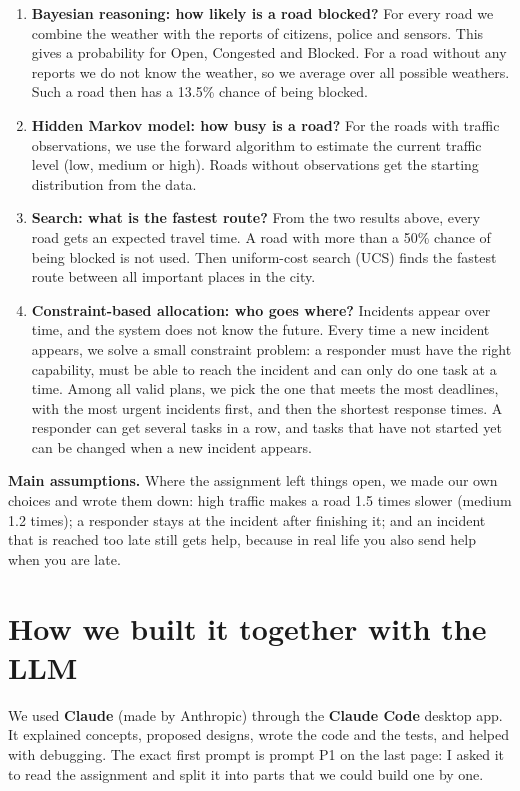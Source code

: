 \documentclass[11pt,a4paper]{article}
\begin{document}
\begin{enumerate}
  \item \textbf{Bayesian reasoning: how likely is a road blocked?}
    For every road we combine the weather with the reports of citizens, police
    and sensors. This gives a probability for Open, Congested and Blocked. For a
    road without any reports we do not know the weather, so we average over all
    possible weathers. Such a road then has a 13.5\% chance of being blocked.
  \item \textbf{Hidden Markov model: how busy is a road?}
    For the roads with traffic observations, we use the forward algorithm to
    estimate the current traffic level (low, medium or high). Roads without
    observations get the starting distribution from the data.
  \item \textbf{Search: what is the fastest route?}
    From the two results above, every road gets an expected travel time. A road
    with more than a 50\% chance of being blocked is not used. Then uniform-cost search
    (UCS) finds the fastest route between all important places in the city.
  \item \textbf{Constraint-based allocation: who goes where?}
    Incidents appear over time, and the system does not know the future. Every
    time a new incident appears, we solve a small constraint problem: a
    responder must have the right capability, must be able to reach the
    incident and can only do one task at a time. Among all valid plans, we pick
    the one that meets the most deadlines, with the most urgent incidents
    first, and then the shortest response times. A responder can get several
    tasks in a row, and tasks that have not started yet can be changed when a
    new incident appears.
\end{enumerate}

\textbf{Main assumptions.} Where the assignment left things open, we made our
own choices and wrote them down: high traffic makes a road 1.5 times slower
(medium 1.2 times); a responder stays at the incident after finishing it; and an
incident that is reached too late still gets help, because in real life you
also send help when you are late.

\section{How we built it together with the LLM}

We used \textbf{Claude} (made by Anthropic) through the \textbf{Claude Code}
desktop app. It explained concepts, proposed designs, wrote the code and the
tests, and helped with debugging. The exact first prompt is prompt P1 on the
last page: I asked it to read the assignment and split it into parts that we
could build one by one.
\end{document}
